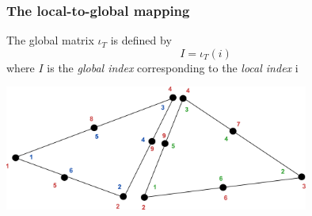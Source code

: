 \begin{frame}
  \frametitle{The local-to-global mapping}

  The global matrix $\iota_T$ is defined by
  \begin{equation*}
    I = \iota_T(i)
  \end{equation*}
  where $I$ is the \emph{global index} corresponding to
  the \emph{local index} i

  \begin{center}
    \includegraphics[width=10cm]{pdf/dofmap.pdf}
  \end{center}

\end{frame}
